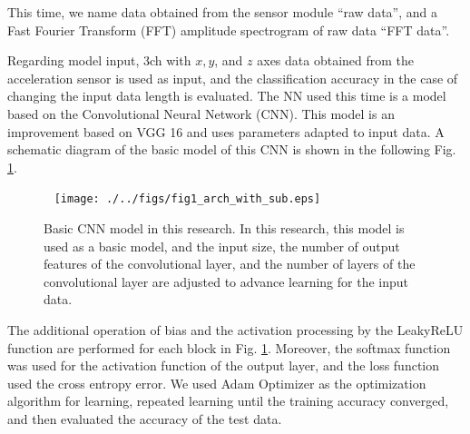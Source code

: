 \documentclass[letterpaper,  10 pt,  conference]{ieeeconf}  %
\begin{document}
This time,  we name data obtained from the sensor module ``raw data'',  and a Fast Fourier Transform (FFT) amplitude spectrogram of raw data ``FFT data''. 







Regarding model input,  3ch with $x,  y$, and $z$ axes data obtained from the acceleration sensor is used as input,  and the classification accuracy in the case of changing the input data length is evaluated. 
The NN used this time is a model based on the Convolutional Neural Network (CNN).  This model is an improvement based on VGG 16 \cite{c6} and uses parameters adapted to input data. 
A schematic diagram of the basic model of this CNN is shown in the following Fig. \ref{model_arch}. 

%

\begin{figure}[thpb]
    \centering





    \texttt{[image: ./../figs/fig1\_arch\_with\_sub.eps]}
    \caption{Basic CNN model in this research. In this research,  this model is used as a basic model,  and the input size,  the number of output features of the convolutional layer,  
    and the number of layers of the convolutional layer are adjusted to advance learning for the input data. 
    }
    \label{model_arch}
 \end{figure}

 The additional operation of bias and the activation processing by the LeakyReLU function are performed for each block in Fig. \ref{model_arch}. 
 Moreover,  the softmax function was used for the activation function of the output layer,  and the loss function used the cross entropy error.  We used Adam Optimizer \cite{c7} as the optimization algorithm 
 for learning,  repeated learning until the training accuracy converged,  and then evaluated the accuracy of the test data. \\
\end{document}
